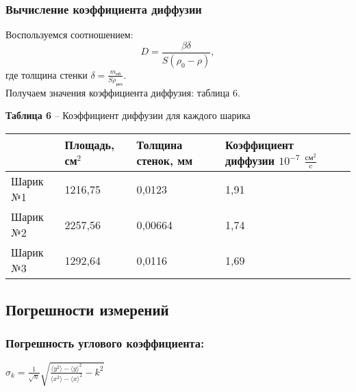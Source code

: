 \documentclass[12pt,a4paper]{article}
\begin{document}
        \newpage
        \subsubsection{Вычисление коэффициента диффузии}
        Воспользуемся соотношением:
            \[
            D = \frac{\beta \delta}{S(\rho_0 - \rho)},
            \]
        где толщина стенки $\delta = \frac{m_\text{об}}{S\rho_\text{рез}}$.\\        
       
        Получаем значения коэффициента диффузия: таблица 6.
       
        \begin{table}[!h]
        \begin{flushleft}
       		\hspace{10}\textbf{Таблица 6} -- Коэффициент диффузии для каждого шарика \\
        \end{flushleft}
            \begin{center}
                \begin{tabular}{ | l | l | l |  l |}
                \hline
                &   Площадь, см$^2$ &   Толщина стенок, мм  &   Коэффициент диффузии $10^{-7}$ $\frac{\text{см}^2}{\text{c}}$   \\
                \hline
                Шарик №1    &   1216,75   & 0,0123  &   1,91      \\
               \hline
                Шарик №2    &   2257,56   & 0,00664 &   1,74     \\
               \hline
                Шарик №3    &   1292,64   & 0,0116  &   1,69     \\
               \hline
               \end{tabular}
            \end{center}
        \end{table}
 
    \subsection{Погрешности измерений}
        \subsubsection{Погрешность углового коэффициента:}
       
            \begin{center}
                $\sigma_{k} = \frac{1}{\sqrt{n}}\sqrt{\frac{\langle y^2 \rangle - \langle y \rangle ^2}{\langle x^2 \rangle - \langle x \rangle ^2} - k^2}$
            \end{center}
               
\end{document}
